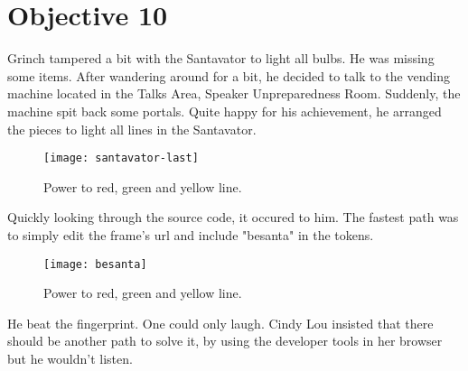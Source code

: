 \chapter{Objective 10}

Grinch tampered a bit with the Santavator to light all bulbs. He was missing some items. After wandering around for a bit, he decided to talk to the vending machine located in the Talks Area, Speaker Unpreparedness Room.
Suddenly, the machine spit back some portals. Quite happy for his achievement, he arranged the pieces to light all lines in the Santavator.
\begin{figure}[h!]
  \texttt{[image: santavator-last]}
  \caption{Power to red, green and yellow line.}
\end{figure}

Quickly looking through the source code, it occured to him. The fastest path was to simply edit the frame's url and include "besanta" in the tokens.
\begin{figure}[h!]
  \texttt{[image: besanta]}
  \caption{Power to red, green and yellow line.}
\end{figure}

He beat the fingerprint. One could only laugh. Cindy Lou insisted that there should be another path to solve it, by using the developer tools in her browser but he wouldn't listen.
